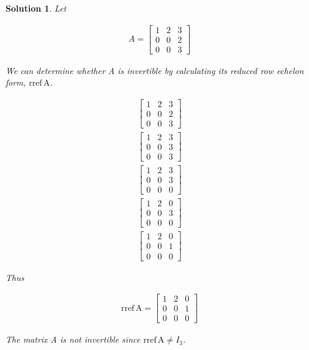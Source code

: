 \documentclass{article}
\newtheorem*{solution}{Solution}
\newcommand{\rref}[1]{\mathrm{rref \, #1}}
\begin{document}
\begin{solution}
Let

\begin{align*}
A = \begin{bmatrix}1 & 2 & 3 \\ 0 & 0 & 2 \\ 0 & 0 & 3 \end{bmatrix}
\end{align*}

We can determine whether A is invertible by calculating its reduced row echelon form, $\rref{A}$.

\begin{align*}
\begin{bmatrix}
1 & 2 & 3 \\
0 & 0 & 2 \\
0 & 0 & 3 
\end{bmatrix} \\
\begin{bmatrix}
1 & 2 & 3 \\
0 & 0 & 3 \\
0 & 0 & 3 
\end{bmatrix} \\
\begin{bmatrix}
1 & 2 & 3 \\
0 & 0 & 3 \\
0 & 0 & 0 
\end{bmatrix} \\
\begin{bmatrix}
1 & 2 & 0 \\
0 & 0 & 3 \\
0 & 0 & 0 
\end{bmatrix} \\
\begin{bmatrix}
1 & 2 & 0 \\
0 & 0 & 1 \\
0 & 0 & 0 
\end{bmatrix} 
\end{align*}

Thus

\begin{align*}
\rref{A} = \begin{bmatrix}
1 & 2 & 0 \\
0 & 0 & 1 \\
0 & 0 & 0 
\end{bmatrix} 
\end{align*}

The matrix A is not invertible since $\rref A \neq I_{3}$.

\end{solution}
\end{document}
